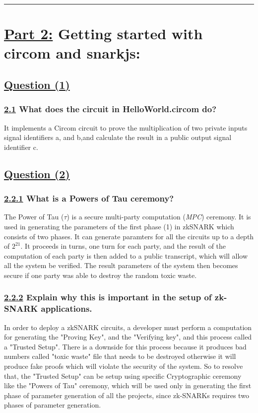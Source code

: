 \documentclass[letterpaper, 10 pt, conference]{ieeeconf}  %
\begin{document}
\noindent\rule{8cm}{0.4pt}

\section{\textbf{\underline{Part 2:}} Getting started with circom and snarkjs:}
\subsection{\textbf{\underline{Question (1)}}}
\subsubsection{\textbf{\underline{2.1} What does the circuit in HelloWorld.circom do?}}

It implements a Circom circuit to prove the multiplication of two private inputs signal identifiers a, and b,and calculate the result in a public output signal identifier c. 

\subsection{\textbf{\underline{Question (2)}}}
\subsubsection{\textbf{\underline{2.2.1} What is a Powers of Tau ceremony?}}

The Power of Tau ($\tau$) is a secure multi-party computation (\textit{MPC}) ceremony. It is used in generating the parameters of the first phase (1) in zkSNARK which consists of two phases. It can generate paramters for all the circuits up to a depth of $2^{21}$. 
It proceeds in turns, one turn for each party, and the result of the computation of each party is then added to a public transcript, which will allow all the system be verified. The result parameters of the system then becomes secure if one party was able to destroy the random toxic waste. \cite{c3}

\subsubsection{\textbf{\underline{2.2.2} Explain why this is important in the setup of zk-SNARK applications.}}


In order to deploy a zkSNARK circuits, a developer must perform a computation for generating the "Proving Key", and the "Verifying key", and this process called a "Trusted Setup". There is a downside for this process because it produces bad numbers called "toxic waste" file that needs to be destroyed otherwise it will produce fake proofs which will violate the security of the system. So to resolve that, the "Trusted Setup" can be setup using specific Cryptographic ceremony like the "Powers of Tau" ceremony, which will be used only in generating the first phase of parameter generation of all the projects, since zk-SNARKs requires two phases of parameter generation. \cite{c4}
\end{document}
